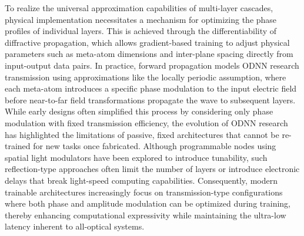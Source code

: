 To realize the universal approximation capabilities of multi-layer cascades, physical implementation necessitates a mechanism for optimizing the phase profiles of individual layers. This is achieved through the differentiability of diffractive propagation, which allows gradient-based training to adjust physical parameters such as meta-atom dimensions and inter-plane spacing directly from input-output data pairs. \citep{doi_10_1117_12_2661856_e8f727e8} \citep{doi_10_1002_mop_70313_0297d592} In practice, forward propagation models ODNN research transmission using approximations like the locally periodic assumption, where each meta-atom introduces a specific phase modulation to the input electric field before near-to-far field transformations propagate the wave to subsequent layers. While early designs often simplified this process by considering only phase modulation with fixed transmission efficiency, the evolution of ODNN research has highlighted the limitations of passive, fixed architectures that cannot be re-trained for new tasks once fabricated. Although programmable nodes using spatial light modulators have been explored to introduce tunability, such reflection-type approaches often limit the number of layers or introduce electronic delays that break light-speed computing capabilities. Consequently, modern trainable architectures increasingly focus on transmission-type configurations where both phase and amplitude modulation can be optimized during training, thereby enhancing computational expressivity while maintaining the ultra-low latency inherent to all-optical systems. \citep{doi_10_1038_s41598_022_19973_0_e156e6e2} \citep{doi_10_1038_s41928_022_00719_9_a2169947}

